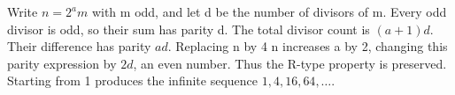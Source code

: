 Write $n=2^a m$ with m odd, and let d be the number of divisors of m. Every odd divisor is odd, so their sum has parity d. The total divisor count is $(a+1)d$. Their difference has parity $ad$. Replacing n by 4 n increases a by 2, changing this parity expression by $2 d$, an even number. Thus the R-type property is preserved. Starting from 1 produces the infinite sequence $1,4,16,64,\ldots$.
